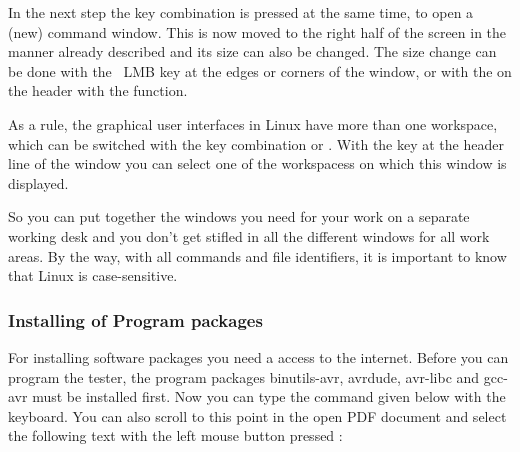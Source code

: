 In the next step the key combination  is pressed at the same time,
to open a (new) command window.
This is now moved to the right half of the screen in the manner already described and
its size can also be changed.
The size change can be done with the \ LMB key at the edges or corners of the window,
or with the \RMB on the header with the   function.

As a rule, the graphical user interfaces in Linux have more than one workspace,
which can be switched with the key combination  or
.
With the \RMB key at the header line of the window you can select one of the workspacess
on which this window is displayed.

So you can put together the windows you need for your work on a separate working desk and
you don't get stifled in all the different windows for all work areas.
By the way, with all commands and file identifiers, it is important to know
that Linux is case-sensitive. 

\subsubsection{Installing of Program packages}

For installing software packages you need a access to the internet.
Before you can program the tester, the program packages
binutils-avr, avrdude, avr-libc and gcc-avr must be installed first.
Now you can type the command given below with the keyboard.
You can also scroll to this point in the open PDF document and select the
following text with the left mouse button pressed \LMB:

